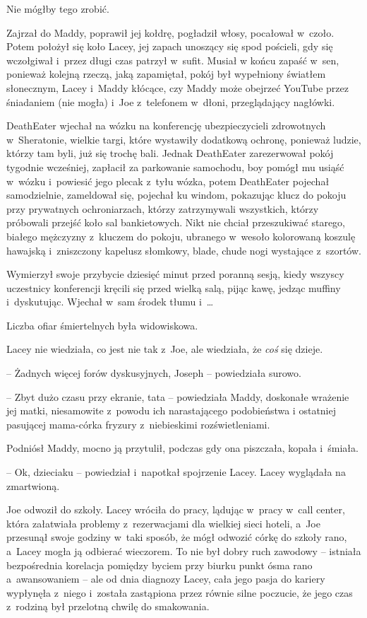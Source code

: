 \documentclass[oneside,polish,11pt,sfheadings]{mwbk}
\begin{document}
Nie mógłby tego zrobić.

Zajrzał do Maddy, poprawił jej kołdrę, pogładził włosy, pocałował w~czoło. Potem położył się koło Lacey, jej zapach unoszący się spod
pościeli, gdy się wczołgiwał i~przez długi czas patrzył w~sufit. Musiał
w końcu zapaść w~sen, ponieważ kolejną rzeczą, jaką zapamiętał, pokój
był wypełniony światłem słonecznym, Lacey i~Maddy kłócące, czy Maddy
może obejrzeć YouTube przez śniadaniem (nie mogła) i~Joe z~telefonem w~dłoni, przeglądający nagłówki.

DeathEater wjechał na wózku na konferencję ubezpieczycieli zdrowotnych w~Sheratonie, wielkie targi, które wystawiły dodatkową ochronę, ponieważ
ludzie, którzy tam byli, już się trochę bali. Jednak DeathEater
zarezerwował pokój tygodnie wcześniej, zapłacił za parkowanie samochodu,
boy pomógł mu usiąść w~wózku i~powiesić jego plecak z~tyłu wózka, potem
DeathEater pojechał samodzielnie, zameldował się, pojechał ku windom,
pokazując klucz do pokoju przy prywatnych ochroniarzach, którzy
zatrzymywali wszystkich, którzy próbowali przejść koło sal bankietowych.
Nikt nie chciał przeszukiwać starego, białego mężczyzny z~kluczem do
pokoju, ubranego w~wesoło kolorowaną koszulę hawajską i~zniszczony
kapelusz słomkowy, blade, chude nogi wystające z~szortów.

Wymierzył swoje przybycie dziesięć minut przed poranną sesją, kiedy
wszyscy uczestnicy konferencji kręcili się przed wielką salą, pijąc
kawę, jedząc muffiny i~dyskutując. Wjechał w~sam środek tłumu i~\ldots 

Liczba ofiar śmiertelnych była widowiskowa.

Lacey nie wiedziała, co jest nie tak z~Joe, ale wiedziała, że \textit{coś}
się dzieje.

-- Żadnych więcej forów dyskusyjnych, Joseph -- powiedziała surowo.

-- Zbyt dużo czasu przy ekranie, tata -- powiedziała Maddy, doskonałe
wrażenie jej matki, niesamowite z~powodu ich narastającego podobieństwa
i ostatniej pasującej mama-córka fryzury z~niebieskimi rozświetleniami.

Podniósł Maddy, mocno ją przytulił, podczas gdy ona piszczała, kopała i~śmiała. 

-- Ok, dzieciaku -- powiedział i~napotkał spojrzenie Lacey. Lacey
wyglądała na zmartwioną.

Joe odwoził do szkoły. Lacey wróciła do pracy, lądując w~pracy w~call
center, która załatwiała problemy z~rezerwacjami dla wielkiej sieci
hoteli, a~Joe przesunął swoje godziny w~taki sposób, że mógł odwozić
córkę do szkoły rano, a~Lacey mogła ją odbierać wieczorem. To nie był
dobry ruch zawodowy -- istniała bezpośrednia korelacja pomiędzy byciem
przy biurku punkt ósma rano a~awansowaniem -- ale od dnia diagnozy Lacey,
cała jego pasja do kariery wypłynęła z~niego i~została zastąpiona przez
równie silne poczucie, że jego czas z~rodziną był przelotną chwilę do
smakowania.
\end{document}
